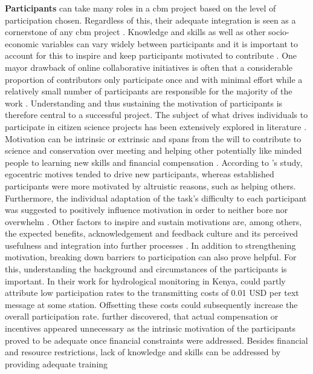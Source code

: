 \textbf{Participants} can take many roles in a \acrshort{cbm} project based on the level of participation chosen. Regardless of this, their adequate integration is seen as a cornerstone of any \acrshort{cbm} project \autocite{land-zandstraParticipantsCitizenScience2021}. Knowledge and skills as well as other socio-economic variables can vary widely between participants and it is important to account for this to inspire and keep participants motivated to contribute \autocite{minkmanCitizenScienceWater2015,whitelawEstablishingCanadianCommunity2003}. One mayor drawback of online collaborative initiatives is often that a considerable proportion of contributors only participate once and with minimal effort while a relatively small number of participants are responsible for the majority of the work \autocite{sauermannCrowdScienceUser2015}. Understanding and thus sustaining the motivation of participants is therefore central to a successful project. The subject of what drives individuals to participate in citizen science projects has been extensively explored in literature \autocite{land-zandstraParticipantsCitizenScience2021,minkmanCitizenScienceWater2015,mloza-bandaCrowdsensingSuccessfulWater2018,ruttenHowGetKeep2017,tipaldoCitizenScienceCommunitybased2017,walkerBenefitsNegativeImpacts2021a,walkerBenefitsNegativeImpacts2021}. Motivation can be intrinsic or extrinsic and spans from the will to contribute to science and conservation over meeting and helping other potentially like minded people to learning new skills and financial compensation \autocite{minkmanCitizenScienceWater2015,rotmanDynamicChangesMotivation2012 ruttenHowGetKeep2017}. According to \autocite{rotmanDynamicChangesMotivation2012}'s study, egocentric motives tended to drive new participants, whereas established participants were more motivated by altruistic reasons, such as helping others. Furthermore, the individual adaptation of the task's difficulty to each participant was suggested to positively influence motivation in order to neither bore nor overwhelm \autocite{minkmanCitizenScienceWater2015}. Other factors to inspire and sustain motivations are, among others, the expected benefits, acknowledgement and feedback culture and its perceived usefulness and integration into further processes \autocite{land-zandstraParticipantsCitizenScience2021,minkmanCitizenScienceWater2015,pettiboneCitizenScienceAll2016}. In addition to strengthening motivation, breaking down barriers to participation can also prove helpful. For this, understanding the background and circumstances of the participants is important. In their work for hydrological monitoring in Kenya, \autocite{weeserCitizenSciencePioneers2018a} could partly attribute low participation rates to the transmitting costs of 0.01 USD per text message at some station. Offsetting these costs could subsequently increase the overall participation rate. \autocite{weeserCitizenSciencePioneers2018a} further discovered, that actual compensation or incentives appeared unnecessary as the intrinsic motivation of the participants proved to be adequate once financial constraints were addressed. Besides financial and resource restrictions, lack of knowledge and skills can be addressed by providing adequate training 